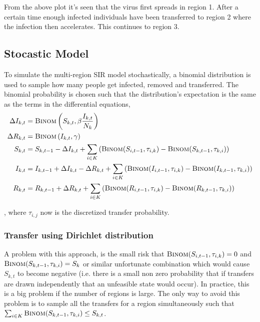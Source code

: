 From the above plot it's seen that the virus first spreads in region 1. After a certain time enough infected individuals have been transferred to region 2 where the infection then accelerates. This continues to region 3.

\subsection{Stocastic Model}

To simulate the multi-region SIR model stochastically, a binomial distribution is used to sample how many people get infected, removed and transferred. The binomial probability is chosen such that the distribution's expectation is the same as the terms in the differential equations,
\begin{equation*}
\begin{aligned}
\Delta I_{k,t} &= \textsc{Binom}\left(S_{k,t}, \beta \frac{I_{k, t}}{N_k}\right) \\
\Delta R_{k,t} &= \textsc{Binom}\left(I_{k,t}, \gamma\right) \\
S_{k,t} &= S_{k,t-1} - \Delta I_{k,t} + \sum_{i \in K} \left(\textsc{Binom}(S_{i,t-1}, \tau_{i,k}) - \textsc{Binom}(S_{k,t-1}, \tau_{k,i})\right) \\
I_{k,t} &= I_{k,t-1} + \Delta I_{k,t} - \Delta R_{k, t} + \sum_{i \in K} \left(\textsc{Binom}(I_{i,t-1}, \tau_{i,k}) - \textsc{Binom}(I_{k,t-1}, \tau_{k,i})\right) \\
R_{k,t} &= R_{k,t-1} + \Delta R_{k, t} + \sum_{i \in K} \left(\textsc{Binom}(R_{i,t-1}, \tau_{i,k}) - \textsc{Binom}(R_{k,t-1}, \tau_{k,i})\right)
\end{aligned}
\end{equation*}

, where $\tau_{i,j}$ now is the discretized transfer probability.

\subsubsection{Transfer using Dirichlet distribution}
A problem with this approach, is the small risk that $\textsc{Binom}(S_{i, t-1}, \tau_{i,k}) = 0$ and $\textsc{Binom}(S_{k, t-1}, \tau_{k,i}) = S_k$ or similar unfortunate combination which would cause $S_{k,t}$ to become negative (i.e. there is a small non zero probability that if transfers are drawn independently that an unfeasible state would occur). In practice, this is a big problem if the number of regions is large. The only way to avoid this problem is to sample all the transfers for a region simultaneously such that $\sum_{i \in K} \textsc{Binom}(S_{k,t-1}, \tau_{k,i}) \le S_{k, t}$.

